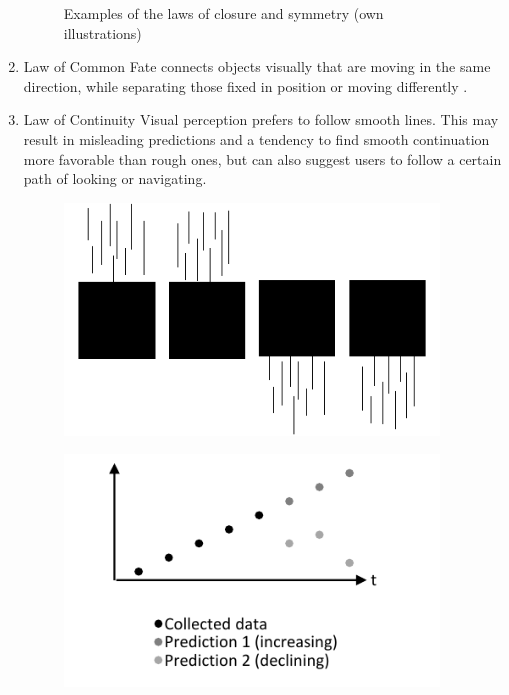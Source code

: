 \begin{enumerate}
\begin{figure}[H]
\begin{minipage}[b]{.5\linewidth}
            \label{fig:sym}
        \end{minipage}
        \caption[Laws of Closure and Symmetry]{Examples of the laws of closure and symmetry (own illustrations)}\label{fig:law2}
    \end{figure}
    \item{Law of Common Fate} connects objects visually that are moving in the same direction, while separating those fixed in position or moving differently \parencite{Todorovic.2008}.
    \item{Law of Continuity} Visual perception prefers to follow smooth lines. This may result in misleading predictions and a tendency to find smooth continuation more favorable than rough ones, but can also suggest users to follow a certain path of looking or navigating. \parencites{Bakar.2017}{Todorovic.2008}
    \begin{figure}[H] 
        \begin{minipage}[b]{.5\linewidth}
            \centering\includegraphics[width=0.94\textwidth]{img/fate.pdf}
            \label{fig:fate}
        \end{minipage}%
        \begin{minipage}[b]{.5\linewidth}
            \centering\includegraphics[width=0.94\textwidth]{img/continuity.pdf}

\end{minipage}
\end{figure}
\end{enumerate}
